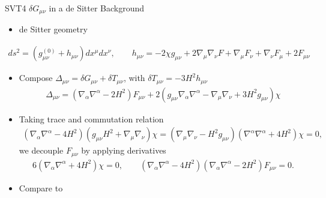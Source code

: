 \documentclass[8pt,aspectratio=1610]{beamer}
\begin{document}
\begin{frame}{SVT4 $\delta G_{\mu\nu}$ in a de Sitter Background}
	\begin{itemize}
		\item de Sitter geometry
	\end{itemize}
	\begin{eqnarray}
		ds^2 =(g_{\mu\nu}^{(0)} + h_{\mu\nu})dx^\mu dx^\nu,\qquad  h_{\mu\nu} = -2\chi g_{\mu\nu} + 2\nabla_\mu\nabla_\nu F + \nabla_\mu F_{\nu} + \nabla_\nu F_{\mu} + 2 F_{\mu\nu}
	\end{eqnarray}
	\begin{itemize}
		\item Compose $\Delta_{\mu\nu} = \delta G_{\mu\nu} + \delta T_{\mu\nu}$, with $\delta T_{\mu\nu} = -3 H^2 h_{\mu\nu}$
		\begin{eqnarray}
		\Delta_{\mu\nu}=(\nabla_{\alpha}\nabla^{\alpha}-2H^2)F_{\mu\nu}+2(g_{\mu\nu}\nabla_{\alpha}\nabla^{\alpha}-\nabla_{\mu}\nabla_{\nu}+3H^2g_{\mu\nu})\chi
		\end{eqnarray}
		\item Taking trace and commutation relation
		\begin{eqnarray}
		(\nabla_{\alpha}\nabla^{\alpha}-4H^2)(g_{\mu\nu}H^2+\nabla_{\mu}\nabla_{\nu})\chi
		=(\nabla_{\mu}\nabla_{\nu}-H^2g_{\mu\nu})(\nabla^{\alpha}\nabla^{\alpha}+4H^2)\chi=0,
		\label{6.30a}
		\end{eqnarray}
		we decouple $F_{\mu\nu}$ by applying derivatives
		\begin{eqnarray}
			6(\nabla_{\alpha}\nabla^{\alpha}+4H^2)\chi=0,\qquad 
			(\nabla_{\alpha}\nabla^{\alpha}-4H^2)(\nabla_{\alpha}\nabla^{\alpha}-2H^2)F_{\mu\nu}=0.
			\label{6.31a}
		\end{eqnarray}
		\item Compare to \hyperlink{svt3ds4}{}
	\end{itemize}
	
\end{frame}

\end{document}
